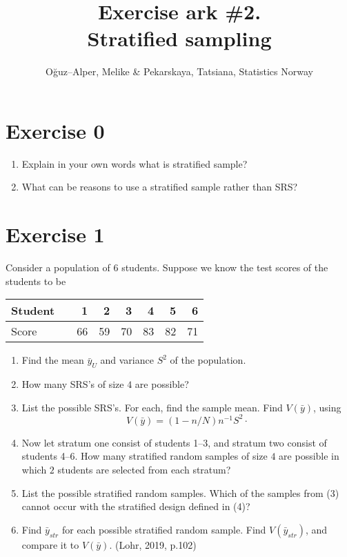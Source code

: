 \documentclass[12pt]{article}
\begin{document}
\title{Exercise ark \#2.\\ Stratified sampling}
\author{O\u{g}uz--Alper, Melike \& Pekarskaya, Tatsiana, Statistics Norway}
\maketitle

\section*{Exercise 0}

\begin{enumerate}
\item Explain in your own words what is stratified sample?
\item What can be reasons to use a stratified sample rather than SRS?
\end{enumerate}

\section*{Exercise 1}

Consider a population of 6 students. Suppose we know the test scores of the students
to be
\begin{center}
\begin{tabular}{lrrrrrrr}
Student & \vline & 1& 2& 3& 4& 5& 6\\
\hline
Score & \vline &  66& 59& 70& 83& 82& 71\\
\end{tabular}
\end{center}
\begin{enumerate}
\item Find the mean $\bar{y}_U$ and variance $S^2$ of the population.
\item How many SRS’s of size $4$ are possible?
\item List the possible SRS’s. For each, find the sample mean. Find $V(\bar{y})$, using $$V(\bar{y})=(1-n/N)n^{-1}S^2\cdot$$
\item Now let stratum one consist of students 1–3, and stratum two consist of students 4–6. How many stratified random samples of size $4$ are possible in which $2$ students are selected from each stratum?
\item List the possible stratified random samples. Which of the samples from (3) cannot occur with the stratified design defined in (4)?
\item Find $\bar{y}_{str}$ for each possible stratified random sample. Find $V(\bar{y}_{str})$, and compare it to $V(\bar{y})$. \hfill (Lohr, 2019, p.102)
\end{enumerate}
\end{document}
